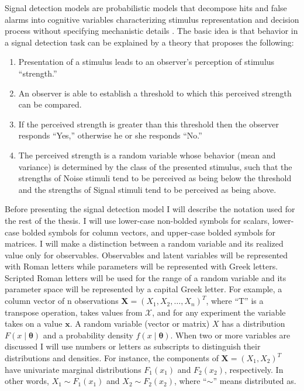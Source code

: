 \documentclass[12pt]{article}
\begin{document}
Signal detection models are probabilistic models that decompose hits and false alarms into cognitive variables characterizing stimulus representation and decision process without specifying mechanistic details
\citep{MacCre2004,LeeWag2014}. The basic idea is that behavior in a
signal detection task can be explained by a theory that
proposes the following:
\begin{enumerate}
\item Presentation of a stimulus leads to an observer's perception of
      stimulus ``strength.''  
\item An observer is able to establish a threshold to which this perceived 
      strength can be compared.  
\item If the perceived strength is greater than this threshold then the 
      observer responds ``Yes,'' otherwise he or she responds ``No.''  
\item The perceived strength is a random variable whose behavior (mean and 
      variance) is determined by the class of the presented stimulus, such 
      that the strengths of Noise stimuli tend to be perceived as being below 
      the threshold and the strengths of Signal stimuli tend to be perceived 
      as being above.  
\end{enumerate} 

Before presenting the signal detection model I will describe the notation used for the rest of the thesis. I will use lower-case non-bolded symbols for scalars, lower-case bolded symbols for column vectors, and upper-case bolded symbols for matrices. I will make a distinction between a random variable and its realized value only for observables. Observables and  latent variables will be represented with Roman letters while parameters will be represented with Greek letters. Scripted Roman letters will be used for the range of a random variable and its parameter space will be represented by a capital Greek letter. For example, a column vector of n observations $\mathbf{X} = (X_1, X_2, \ldots, X_n)^T$, where ``T'' is a transpose operation, takes values from $\mathcal{X}$, and for any experiment the variable takes on a value $\mathbf{x}$. A random variable (vector or matrix) $X$ has a distribution $F(x \mid \mathbf{\theta})$ and a probability density $f(x \mid \mathbf{\theta})$. When two or more variables are discussed I will use numbers or letters as subscripts to distinguish their distributions and densities. For instance, the components of $\mathbf{X} = (X_1, X_2)^T$ have univariate marginal distributions $F_1(x_1)$ and $F_2(x_2)$, respectively. In other words, $X_1 \sim F_1(x_1)$ and $X_2 \sim F_2(x_2)$, where ``$\sim$'' means distributed as. 
\end{document}
